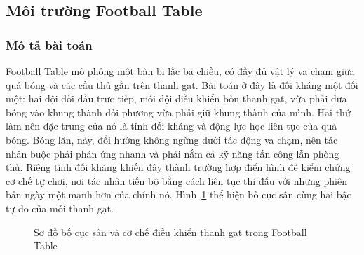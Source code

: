 \subsection{Môi trường Football Table}
\label{sub:env-football}

\subsubsection{Mô tả bài toán}
\indent Football Table mô phỏng một bàn bi lắc ba chiều, có đầy đủ vật lý va chạm giữa quả
bóng và các cầu thủ gắn trên thanh gạt. Bài toán ở đây là đối kháng một đối một: hai đội
đối đầu trực tiếp, mỗi đội điều khiển bốn thanh gạt, vừa phải đưa bóng vào khung thành đối
phương vừa phải giữ khung thành của mình. Hai thứ làm nên đặc trưng của nó là tính đối
kháng và động lực học liên tục của quả bóng. Bóng lăn, nảy, đổi hướng không ngừng dưới tác
động va chạm, nên tác nhân buộc phải phản ứng nhanh và phải nắm cả kỹ năng tấn công lẫn
phòng thủ. Riêng tính đối kháng khiến đây thành trường hợp điển hình để kiểm chứng cơ chế
tự chơi, nơi tác nhân tiến bộ bằng cách liên tục thi đấu với những phiên bản ngày một mạnh
hơn của chính nó. Hình~\ref{fig:football_layout} thể hiện bố cục sân cùng hai bậc tự do
của mỗi thanh gạt.

\begin{figure}[H]
\centering
{}
\caption{Sơ đồ bố cục sân và cơ chế điều khiển thanh gạt trong Football Table}
\label{fig:football_layout}
\end{figure}


